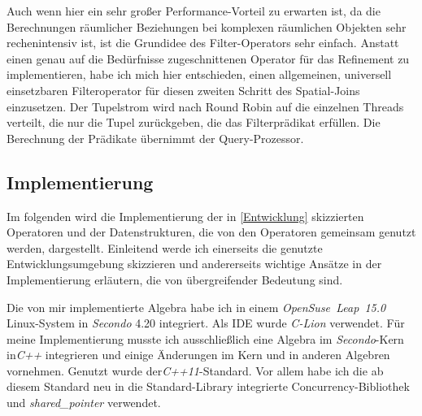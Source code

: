 \documentclass[a4paper,12pt,twoside]{article}
\newcommand{\Fb}[1]{\textit{#1}} %
\begin{document}
Auch wenn hier ein sehr großer Performance-Vorteil zu erwarten ist, da die Berechnungen räumlicher Beziehungen bei komplexen räumlichen Objekten sehr rechenintensiv ist, ist die Grundidee des Filter-Operators sehr einfach. Anstatt einen genau auf die Bedürfnisse zugeschnittenen Operator für das Refinement zu implementieren, habe ich mich hier entschieden, einen allgemeinen, universell einsetzbaren Filteroperator für diesen zweiten Schritt des Spatial-Joins einzusetzen. Der Tupelstrom wird nach Round Robin auf die einzelnen Threads verteilt, die nur die Tupel zurückgeben, die das Filterprädikat erfüllen. Die Berechnung der Prädikate übernimmt der Query-Prozessor.

\subsection{Implementierung}
\label{Implemeniterung} 

Im folgenden wird die Implementierung der in \autoref{Entwicklung} skizzierten Operatoren und der Datenstrukturen, die von den Operatoren gemeinsam genutzt werden, dargestellt. Einleitend werde ich einerseits die genutzte Entwicklungsumgebung skizzieren und andererseits wichtige Ansätze in der Implementierung erläutern, die von übergreifender Bedeutung sind.

Die von mir implementierte Algebra habe ich in einem \Fb{OpenSuse~Leap~15.0} Linux-System in \Fb{Secondo} 4.20 integriert. Als IDE wurde \Fb{C-Lion} verwendet. Für meine Implementierung musste ich ausschließlich eine Algebra im \Fb{Secondo}-Kern in\Fb{C++} integrieren und einige Änderungen im Kern und in anderen Algebren vornehmen. Genutzt wurde der\Fb{C++11}-Standard. Vor allem habe ich die ab diesem Standard neu in die Standard-Library integrierte Concurrency-Bibliothek und \Fb{shared\_pointer} verwendet.
\end{document}
